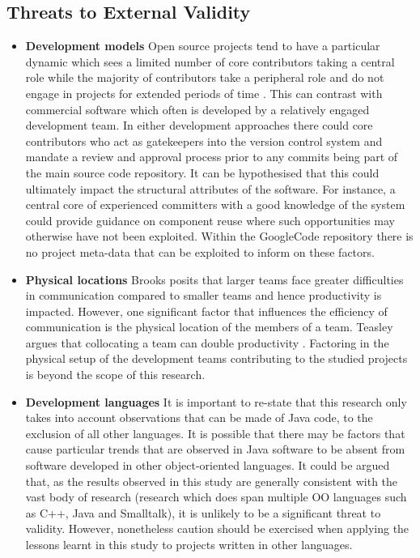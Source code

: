 \subsection{Threats to External Validity}

\begin{itemize}
\item  \textbf{Development models} Open source projects tend to have a particular dynamic which sees a limited number of core contributors taking a central role while the majority of contributors take a peripheral role and do not engage in projects for extended periods of time \citep{howison2006social}. This can contrast with commercial software which often is developed by a relatively engaged development team. In either development approaches there could core contributors who act as gatekeepers into the version control system and mandate a review and approval process prior to any commits being part of the main source code repository. It can be hypothesised that this could ultimately impact the structural attributes of the software. For instance, a central core of experienced committers with a good knowledge of the system could provide guidance on component reuse where such opportunities may otherwise have not been exploited. Within the GoogleCode repository there is no project meta-data that can be exploited to inform on these factors.

\item  \textbf{Physical locations} Brooks posits that larger teams face greater difficulties in communication compared to smaller teams and hence productivity is impacted. However, one significant factor that influences the efficiency of communication is the physical location of the members of a team. Teasley argues that collocating a team can double productivity \citep{teasley2000does}. Factoring in the physical setup of the development teams contributing to the studied projects is beyond the scope of this research.

\item  \textbf{Development languages} It is important to re-state that this research only takes into account observations that can be made of Java code, to the exclusion of all other languages. It is possible that there may be factors that cause particular trends that are observed in Java software to be absent from software developed in other object-oriented languages. It could be argued that, as the results observed in this study are generally consistent with the vast body of research (research which does span multiple OO languages such as C++, Java and Smalltalk), it is unlikely to be a significant threat to validity. However, nonetheless caution should be exercised when applying the lessons learnt in this study to projects written in other languages.


\end{itemize}
